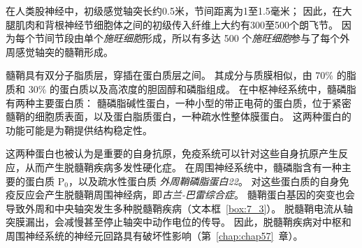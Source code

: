 在人类股神经中，初级感觉轴突长约0.5米，节间距离为1至1.5毫米；
因此，在大腿肌肉和背根神经节细胞体之间的初级传入纤维上大约有300至500个朗飞节。
因为每个节间节段由单个\textit{施旺细胞}形成，所以有多达 500 个\textit{施旺细胞}参与了每个外周感觉轴突的髓鞘形成。


髓鞘具有双分子脂质层，穿插在蛋白质层之间。
其成分与质膜相似，由 70\% 的脂质和 30\% 的蛋白质以及高浓度的胆固醇和磷脂组成。
在中枢神经系统中，髓磷脂有两种主要蛋白质：
髓磷脂碱性蛋白，一种小型的带正电荷的蛋白质，位于紧密髓鞘的细胞质表面，以及蛋白脂质蛋白，一种疏水性整体膜蛋白。
这两种蛋白的功能可能是为鞘提供结构稳定性。



这两种蛋白也被认为是重要的自身抗原，免疫系统可以针对这些自身抗原产生反应，从而产生脱髓鞘疾病多发性硬化症。 
在周围神经系统中，髓磷脂含有一种主要的蛋白质 P$_0$，以及疏水性蛋白质 \textit{外周鞘磷脂蛋白22}。
对这些蛋白质的自身免疫反应会产生脱髓鞘周围神经病，即\textit{古兰-巴雷综合症}。
髓鞘蛋白基因的突变也会导致外周和中央轴突发生多种脱髓鞘疾病（文本框~\ref{box:7_3}）。
脱髓鞘电流从轴突膜漏出，会减慢甚至停止轴突中动作电位的传导。
因此，脱髓鞘疾病对中枢和周围神经系统的神经元回路具有破坏性影响（第~\ref{chap:chap57}~章）。


